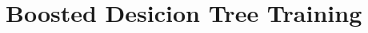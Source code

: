 \documentclass[12pt, a4paper]{book}
\begin{document}
\clearpage




\section{Boosted Desicion Tree Training}
\end{document}
